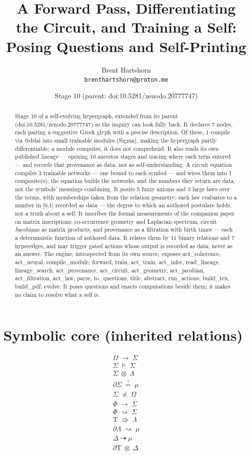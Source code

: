 \documentclass[11pt]{article}
\title{A Forward Pass, Differentiating the Circuit, and Training a Self: Posing Questions and Self-Printing}\author{Brent Hartshorn\\ \texttt{brenthartshorn@proton.me}}
\date{Stage 10 \quad (parent: doi:10.5281/zenodo.20777747)}
\newcommand{\Tau}{\mathrm{T}}
\begin{document}
\maketitle
\begin{abstract}Stage 10 of a self-evolving hypergraph, extended from its parent (doi:10.5281/zenodo.20777747) so the inquiry can look fully back. It declares 7 nodes, each pairing a suggestive Greek glyph with a precise description. Of these, 1 compile via @dslai into small trainable modules (Sigma), making the hypergraph partly differentiable; a module computes, it does not comprehend. It also reads its own published lineage --- opening 10 ancestor stages and tracing where each term entered --- and records that provenance as data, not as self-understanding. A circuit equation compiles 3 trainable networks --- one bound to each symbol --- and wires them into 1 composite(s); the equation builds the networks, and the numbers they return are data, not the symbols' meanings combining. It posits 5 fuzzy axioms and 3 large laws over the terms, with memberships taken from the relation geometry; each law evaluates to a number in [0,1] recorded as data --- the degree to which an authored postulate holds, not a truth about a self. It inscribes the formal measurements of the companion paper on matrix inscriptions: co-occurrence geometry and Laplacian spectrum, circuit Jacobians as matrix products, and provenance as a filtration with birth times --- each a deterministic function of authored data. It relates them by 11 binary relations and 7 hyperedges, and may trigger gated actions whose output is recorded as data, never as an answer. The engine, introspected from its own source, exposes act\_coherence, act\_neural, compile\_module, forward, train, act\_train, act\_infer, read\_lineage, lineage\_search, act\_provenance, act\_circuit, act\_geometry, act\_jacobian, act\_filtration, act\_law, parse, to\_questions, title, abstract, run\_actions, build\_tex, build\_pdf, evolve. It poses questions and enacts computations beside them; it makes no claim to resolve what a self is.\end{abstract}
\section*{Symbolic core (inherited relations)}\begin{align*}
\Omega \; \longrightarrow \; \Sigma \\[3pt] \Sigma \; \models \; \Sigma \\[3pt] \Sigma \; \otimes \; \Lambda \\[3pt] \partial \Sigma \; \stackrel{?}{=} \; \mu \\[3pt] \Sigma \; \nprec \; \Omega \\[3pt] \Phi \; \longrightarrow \; \Sigma \\[3pt] \Phi \; \rightsquigarrow \; \Sigma \\[3pt] \Tau \; \Rrightarrow \; \Lambda \\[3pt] \partial \Lambda \; \rightsquigarrow \; \mu \\[3pt] \Delta \; \dashrightarrow \; \mu \\[3pt] \partial \Tau \; \otimes \; \Delta
\end{align*}
\end{document}
